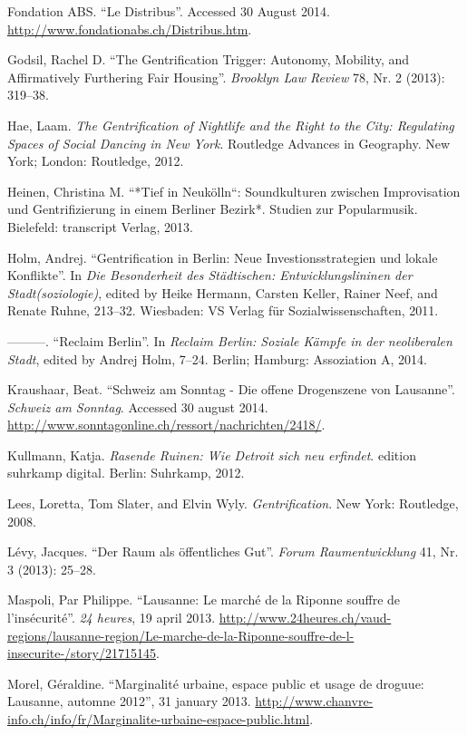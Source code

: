 \documentclass[a4paper,
fontsize=11pt,
oneside,
numbers=noperiodatend,
parskip=half-,
bibliography=totoc,
final
]{scrartcl}
\begin{document}
Fondation ABS. \enquote{Le Distribus}. Accessed 30 August 2014.
\url{http://www.fondationabs.ch/Distribus.htm}.

Godsil, Rachel D. \enquote{The Gentrification Trigger: Autonomy,
Mobility, and Affirmatively Furthering Fair Housing}. \emph{Brooklyn Law
Review} 78, Nr. 2 (2013): 319--38.

Hae, Laam. \emph{The Gentrification of Nightlife and the Right to the
City: Regulating Spaces of Social Dancing in New York}. Routledge
Advances in Geography. New York; London: Routledge, 2012.

Heinen, Christina M. ``*Tief in Neukölln``: Soundkulturen zwischen
Improvisation und Gentrifizierung in einem Berliner Bezirk*. Studien zur
Popularmusik. Bielefeld: transcript Verlag, 2013.

Holm, Andrej. \enquote{Gentrification in Berlin: Neue
Investionsstrategien und lokale Konflikte}. In \emph{Die Besonderheit
des Städtischen: Entwicklungslininen der Stadt(soziologie)}, edited by
Heike Hermann, Carsten Keller, Rainer Neef, and Renate Ruhne, 213--32.
Wiesbaden: VS Verlag für Sozialwissenschaften, 2011.

---------. \enquote{Reclaim Berlin}. In \emph{Reclaim Berlin: Soziale
Kämpfe in der neoliberalen Stadt}, edited by Andrej Holm, 7--24. Berlin;
Hamburg: Assoziation A, 2014.

Kraushaar, Beat. \enquote{Schweiz am Sonntag - Die offene Drogenszene
von Lausanne}. \emph{Schweiz am Sonntag}. Accessed 30 august 2014.
\url{http://www.sonntagonline.ch/ressort/nachrichten/2418/}.

Kullmann, Katja. \emph{Rasende Ruinen: Wie Detroit sich neu erfindet}.
edition suhrkamp digital. Berlin: Suhrkamp, 2012.

Lees, Loretta, Tom Slater, and Elvin Wyly. \emph{Gentrification}. New
York: Routledge, 2008.

Lévy, Jacques. \enquote{Der Raum als öffentliches Gut}. \emph{Forum
Raumentwicklung} 41, Nr. 3 (2013): 25--28.

Maspoli, Par Philippe. \enquote{Lausanne: Le marché de la Riponne
souffre de l'insécurité}. \emph{24 heures}, 19 april 2013.
\url{http://www.24heures.ch/vaud-regions/lausanne-region/Le-marche-de-la-Riponne-souffre-de-l-insecurite-/story/21715145}.

Morel, Géraldine. \enquote{Marginalité urbaine, espace public et usage
de droguue: Lausanne, automne 2012}, 31 january 2013.
\url{http://www.chanvre-info.ch/info/fr/Marginalite-urbaine-espace-public.html}.
\end{document}
